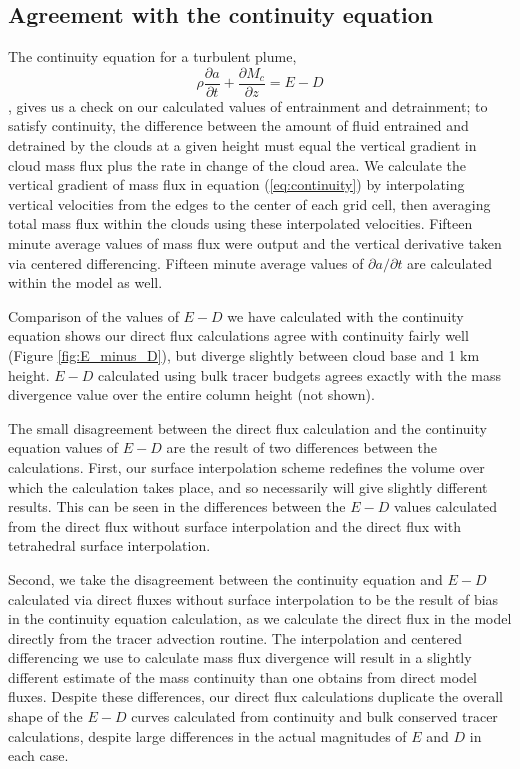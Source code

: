 \documentclass[12pt]{article}
\begin{document}
\subsection{Agreement with the continuity equation}

The continuity equation for a turbulent plume, 
\begin{equation}
    \label{eq:continuity}
    \rho \frac{\partial a}{\partial t} 
    + \frac{\partial M_c}{\partial z}
    = E - D
\end{equation},
gives us a check on our calculated values of entrainment and detrainment; to 
satisfy continuity, the difference between the amount of fluid entrained and 
detrained by the clouds at a given height must equal the vertical gradient in 
cloud mass flux plus the rate in change of the cloud area.  We calculate the 
vertical gradient of mass flux in equation (\ref{eq:continuity}) by 
interpolating vertical velocities from the edges to the center of each grid 
cell, then averaging total mass flux within the clouds using these interpolated 
velocities.  Fifteen minute average values of mass flux were output and the 
vertical derivative taken via centered differencing.  Fifteen minute average 
values of $\partial a/\partial t$ are calculated within the model as well.

Comparison of the values of $E-D$ we have calculated with the continuity 
equation shows our direct flux calculations agree with continuity fairly well
(Figure \ref{fig:E_minus_D}), but diverge slightly between cloud base and 1 km
height.  $E-D$ calculated using bulk tracer budgets agrees exactly with the
mass divergence value over the entire column height (not shown).

The small disagreement between the direct flux calculation and the continuity 
equation values of $E-D$ are the result of two differences between the 
calculations.  First, our surface interpolation scheme redefines the volume 
over which the calculation takes place, and so necessarily will give slightly 
different results.  This can be seen in the differences between the $E-D$ 
values calculated from the direct flux without surface interpolation and the 
direct flux with tetrahedral surface interpolation.

Second, we take the disagreement between the continuity equation and $E-D$
calculated via direct fluxes without surface interpolation to be the result of
bias in the continuity equation calculation, as we calculate the direct flux in
the model directly from the tracer advection routine.  The interpolation and
centered differencing we use to calculate mass flux divergence will result in a
slightly different estimate of the mass continuity than one obtains from direct
model fluxes.  Despite these differences, our direct flux calculations 
duplicate the overall shape of the $E-D$ curves calculated from continuity and 
bulk conserved tracer calculations, despite large differences in the actual
magnitudes of $E$ and $D$ in each case.
\end{document}

